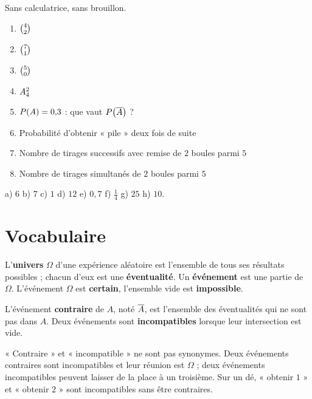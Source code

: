 \begin{automatismes}
Sans calculatrice, sans brouillon.

\begin{enumerate}[label=\textbf{\alph*)}, leftmargin=*, itemsep=0.25em]
  \item $\combi{2}{4}$
  \item $\combi{1}{7}$
  \item $\combi{0}{5}$
  \item $\arrang{2}{4}$
  \item $\proba{A} = 0{,}3$ : que vaut $\proba{\evtc{A}}$ ?
  \item Probabilité d'obtenir « pile » deux fois de suite
  \item Nombre de tirages successifs avec remise de $2$ boules parmi $5$
  \item Nombre de tirages simultanés de $2$ boules parmi $5$
\end{enumerate}
\end{automatismes}

\begin{corrige}[automatismes]
a) $6$ \quad b) $7$ \quad c) $1$ \quad d) $12$ \quad e) $0{,}7$ \quad
f) $\frac14$ \quad g) $25$ \quad h) $10$.
\end{corrige}

\section{Vocabulaire}

\begin{definition}
L'\textbf{univers} $\Omega$ d'une expérience aléatoire est l'ensemble de tous
ses résultats possibles ; chacun d'eux est une \textbf{éventualité}. Un
\textbf{événement} est une partie de $\Omega$. L'événement $\Omega$ est
\textbf{certain}, l'ensemble vide est \textbf{impossible}.

L'événement \textbf{contraire} de $A$, noté $\evtc{A}$, est l'ensemble des
éventualités qui ne sont pas dans $A$. Deux événements sont
\textbf{incompatibles} lorsque leur intersection est vide.
\end{definition}

\begin{avertissement}
« Contraire » et « incompatible » ne sont pas synonymes. Deux événements
contraires sont incompatibles et leur réunion est $\Omega$ ; deux événements
incompatibles peuvent laisser de la place à un troisième. Sur un dé, « obtenir
$1$ » et « obtenir $2$ » sont incompatibles sans être contraires.
\end{avertissement}

